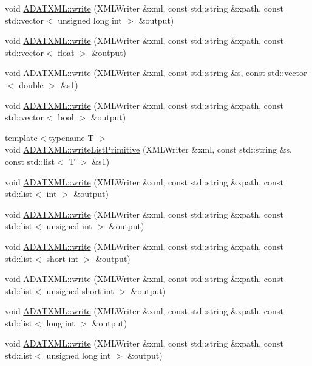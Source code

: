 \begin{DoxyCompactItemize}
\item 
void \mbox{\hyperlink{group__io_gaddbbc6b8d1fa2d88b2b7d0ecd3e36884}{A\+D\+A\+T\+X\+M\+L\+::write}} (X\+M\+L\+Writer \&xml, const std\+::string \&xpath, const std\+::vector$<$ unsigned long int $>$ \&output)
\item 
void \mbox{\hyperlink{group__io_ga21089f03811e37a0d78c969c6a611f59}{A\+D\+A\+T\+X\+M\+L\+::write}} (X\+M\+L\+Writer \&xml, const std\+::string \&xpath, const std\+::vector$<$ float $>$ \&output)
\item 
void \mbox{\hyperlink{group__io_gab54b00e1a7cbc507061351d54d6de9fe}{A\+D\+A\+T\+X\+M\+L\+::write}} (X\+M\+L\+Writer \&xml, const std\+::string \&s, const std\+::vector$<$ double $>$ \&s1)
\item 
void \mbox{\hyperlink{group__io_ga5ca658ba9d302064625a4be34293839a}{A\+D\+A\+T\+X\+M\+L\+::write}} (X\+M\+L\+Writer \&xml, const std\+::string \&xpath, const std\+::vector$<$ bool $>$ \&output)
\item 
{\footnotesize template$<$typename T $>$ }\\void \mbox{\hyperlink{namespaceADATXML_a5b78d711d4d08d62696771f2f4187384}{A\+D\+A\+T\+X\+M\+L\+::write\+List\+Primitive}} (X\+M\+L\+Writer \&xml, const std\+::string \&s, const std\+::list$<$ T $>$ \&s1)
\item 
void \mbox{\hyperlink{group__io_gaab9fb8d6cd603f8b6b5c6b493935eade}{A\+D\+A\+T\+X\+M\+L\+::write}} (X\+M\+L\+Writer \&xml, const std\+::string \&xpath, const std\+::list$<$ int $>$ \&output)
\item 
void \mbox{\hyperlink{group__io_ga6026879ab5fc4a25f24c2f9f88d731b5}{A\+D\+A\+T\+X\+M\+L\+::write}} (X\+M\+L\+Writer \&xml, const std\+::string \&xpath, const std\+::list$<$ unsigned int $>$ \&output)
\item 
void \mbox{\hyperlink{group__io_ga9e8def0c78f0db9648bdf8a6ef4b0832}{A\+D\+A\+T\+X\+M\+L\+::write}} (X\+M\+L\+Writer \&xml, const std\+::string \&xpath, const std\+::list$<$ short int $>$ \&output)
\item 
void \mbox{\hyperlink{group__io_ga9b4ce3375767d9485b3d5dcbf535d4a4}{A\+D\+A\+T\+X\+M\+L\+::write}} (X\+M\+L\+Writer \&xml, const std\+::string \&xpath, const std\+::list$<$ unsigned short int $>$ \&output)
\item 
void \mbox{\hyperlink{group__io_ga323fbb7d576696f27ec4eb34519c1fc7}{A\+D\+A\+T\+X\+M\+L\+::write}} (X\+M\+L\+Writer \&xml, const std\+::string \&xpath, const std\+::list$<$ long int $>$ \&output)
\item 
void \mbox{\hyperlink{group__io_ga1cae344439dcb1355afb4b89f85e7e1b}{A\+D\+A\+T\+X\+M\+L\+::write}} (X\+M\+L\+Writer \&xml, const std\+::string \&xpath, const std\+::list$<$ unsigned long int $>$ \&output)

\end{DoxyCompactItemize}
